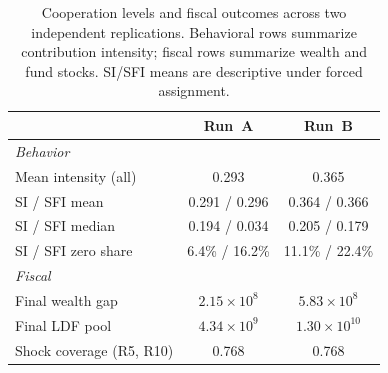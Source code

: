 \begin{table}[t]
\centering
\caption{Cooperation levels and fiscal outcomes across two independent replications.
Behavioral rows summarize contribution intensity; fiscal rows summarize wealth and fund stocks.
SI/SFI means are descriptive under forced assignment.}
\label{tab:coop_summary}
\scriptsize
\setlength{\tabcolsep}{3pt}
\begin{tabular}{lcc}
\toprule
& Run~A & Run~B \\
\midrule
\multicolumn{3}{l}{\emph{Behavior}} \\
Mean intensity (all) & 0.293 & 0.365 \\
SI / SFI mean & 0.291 / 0.296 & 0.364 / 0.366 \\
SI / SFI median & 0.194 / 0.034 & 0.205 / 0.179 \\
SI / SFI zero share & 6.4\% / 16.2\% & 11.1\% / 22.4\% \\
\midrule
\multicolumn{3}{l}{\emph{Fiscal}} \\
Final wealth gap & $2.15\times10^{8}$ & $5.83\times10^{8}$ \\
Final LDF pool & $4.34\times10^{9}$ & $1.30\times10^{10}$ \\
Shock coverage (R5, R10) & 0.768 & 0.768 \\
\bottomrule
\end{tabular}
\end{table}
